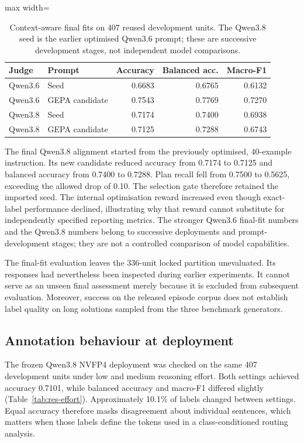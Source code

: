 \documentclass[12pt,a4paper,twoside,openright]{book}
\begin{document}
\begin{table}[!ht]
\centering\small
\caption{Context-aware final fits on 407 reused development units. The Qwen3.8 seed is the earlier optimised Qwen3.6 prompt; these are successive development stages, not independent model comparisons.}
\label{tab:res-judge}
\begin{adjustbox}{max width=\linewidth}%
\begin{tabular}{llrrr}
\toprule
Judge & Prompt & Accuracy & Balanced acc. & Macro-F1 \\
\midrule
Qwen3.6 & Seed & 0.6683 & 0.6765 & 0.6132 \\
Qwen3.6 & GEPA candidate & 0.7543 & 0.7769 & 0.7270 \\
Qwen3.8 & Seed & 0.7174 & 0.7400 & 0.6938 \\
Qwen3.8 & GEPA candidate & 0.7125 & 0.7288 & 0.6743 \\
\bottomrule
\end{tabular}
\end{adjustbox}
\end{table}


The final Qwen3.8 alignment started from the previously optimised,
40-example instruction. Its new candidate reduced accuracy from 0.7174 to
0.7125 and balanced accuracy from 0.7400 to 0.7288. Plan recall fell from
0.7500 to 0.5625, exceeding the allowed drop of 0.10. The selection gate
therefore retained the imported seed. The internal optimisation reward
increased even though exact-label performance declined, illustrating why
that reward cannot substitute for independently specified reporting metrics.
The stronger Qwen3.6 final-fit numbers and the Qwen3.8 numbers belong to
successive deployments and prompt-development stages; they are not a
controlled comparison of model capabilities.

The final-fit evaluation leaves the 336-unit locked partition unevaluated. Its
responses had nevertheless been inspected during earlier experiments. It
cannot serve as an unseen final assessment merely because it is excluded from
subsequent evaluation. Moreover, success on the released episode corpus does
not establish label quality on long solutions sampled from the three benchmark
generators.

\subsection{Annotation behaviour at deployment}

The frozen Qwen3.8 NVFP4 deployment was checked on the same 407 development
units under low and medium reasoning effort. Both settings achieved accuracy
0.7101, while balanced accuracy and macro-F1 differed slightly
(Table~\ref{tab:res-effort}). Approximately 10.1\% of labels changed between
settings. Equal accuracy therefore masks disagreement about individual
sentences, which matters when those labels define the tokens used in a
class-conditioned routing analysis.
\end{document}
